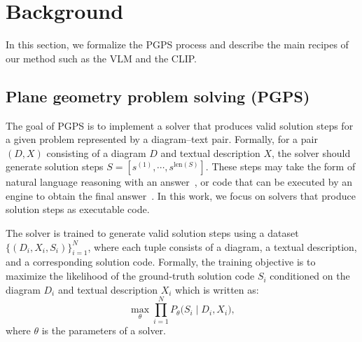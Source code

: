 \section{Background}

In this section, we formalize the PGPS process and describe the main recipes of our method such as the VLM and the CLIP.

\subsection{Plane geometry problem solving (PGPS)}


The goal of PGPS is to implement a solver that produces valid solution steps for a given problem represented by a diagram–text pair. Formally, for a pair \((D, X)\) consisting of a diagram \(D\) and textual description \(X\), the solver should generate solution steps \(S = [s^{(1)}, \cdots, s^{\text{len}(S)}]\). These steps may take the form of natural language reasoning with an answer~\citep{gllava,mavis}, or code that can be executed by an engine to obtain the final answer~\citep{geoqa,unigeo,pgps}. In this work, we focus on solvers that produce solution steps as executable code.

The solver is trained to generate valid solution steps using a dataset \(\{(D_i, X_i, S_i)\}_{i=1}^N\), where each tuple consists of a diagram, a textual description, and a corresponding solution code. Formally, the training objective is to maximize the likelihood of the ground-truth solution code \(S_i\) conditioned on the diagram \(D_i\) and textual description \(X_i\) which is written as:
\begin{equation}
    \max_\theta \prod_{i=1}^{N} P_\theta\bigl(S_i \mid D_i, X_i\bigr),
    \label{eq:objective}
\end{equation}
where $\theta$ is the parameters of a solver.

